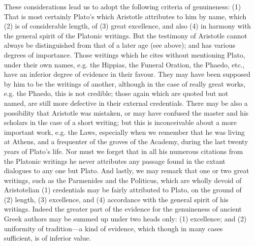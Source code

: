 \documentclass[11pt,letter]{article}
\begin{document}
\par  These considerations lead us to adopt the following criteria of genuineness: (1) That is most certainly Plato's which Aristotle attributes to him by name, which (2) is of considerable length, of (3) great excellence, and also (4) in harmony with the general spirit of the Platonic writings. But the testimony of Aristotle cannot always be distinguished from that of a later age (see above); and has various degrees of importance. Those writings which he cites without mentioning Plato, under their own names, e.g. the Hippias, the Funeral Oration, the Phaedo, etc., have an inferior degree of evidence in their favour. They may have been supposed by him to be the writings of another, although in the case of really great works, e.g. the Phaedo, this is not credible; those again which are quoted but not named, are still more defective in their external credentials. There may be also a possibility that Aristotle was mistaken, or may have confused the master and his scholars in the case of a short writing; but this is inconceivable about a more important work, e.g. the Laws, especially when we remember that he was living at Athens, and a frequenter of the groves of the Academy, during the last twenty years of Plato's life. Nor must we forget that in all his numerous citations from the Platonic writings he never attributes any passage found in the extant dialogues to any one but Plato. And lastly, we may remark that one or two great writings, such as the Parmenides and the Politicus, which are wholly devoid of Aristotelian (1) credentials may be fairly attributed to Plato, on the ground of (2) length, (3) excellence, and (4) accordance with the general spirit of his writings. Indeed the greater part of the evidence for the genuineness of ancient Greek authors may be summed up under two heads only: (1) excellence; and (2) uniformity of tradition—a kind of evidence, which though in many cases sufficient, is of inferior value.
\end{document}
